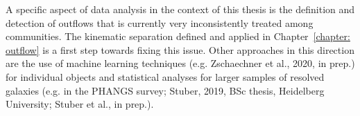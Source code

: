 A specific aspect of data analysis in the context of this thesis is the definition and detection of outflows that is currently very inconsistently treated among communities. The kinematic separation defined and applied in Chapter~\ref{chapter: outflow} is a first step towards fixing this issue. Other approaches in this direction are the use of machine learning techniques (e.g. Zschaechner et al., 2020, in prep.) for individual objects and statistical analyses for larger samples of resolved galaxies (e.g. in the PHANGS survey; Stuber, 2019, BSc thesis, Heidelberg University; Stuber et al., in prep.).



